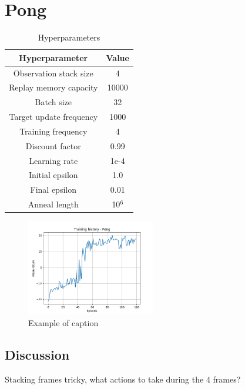 \documentclass[a4paper,10pt]{article}
\begin{document}
\section{Pong}

\begin{table}[ht]
\centering
\begin{tabular}{|c|c|}
\hline
\textbf{Hyperparameter} & \textbf{Value} \\
\hline
Observation stack size & 4 \\
Replay memory capacity & 10000 \\
Batch size & 32 \\
Target update frequency & 1000 \\
Training frequency & 4 \\
Discount factor & 0.99 \\
Learning rate & 1e-4 \\
Initial epsilon & 1.0 \\
Final epsilon & 0.01 \\
Anneal length & 10$^6$ \\
\hline
\end{tabular}
\caption{Hyperparameters}
\label{tab:hyperparameters}
\end{table}


\begin{figure}[ht!]
\centering
\includegraphics[width=0.5\textwidth]{figures/Pong_history_1.png}
\caption{Example of caption}
\label{fig:example}
\end{figure}

\subsection*{Discussion}
Stacking frames tricky, 
what actions to take during the 4 frames?




\end{document}
